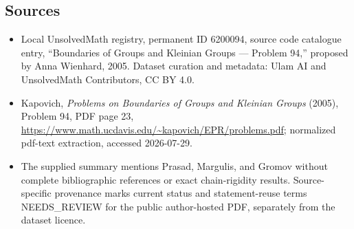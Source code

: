 \documentclass[11pt]{article}
\begin{document}
\subsection{Sources}
\begin{itemize}
\item Local UnsolvedMath registry, permanent ID 6200094, source code catalogue entry, ``Boundaries of Groups and Kleinian Groups --- Problem 94,'' proposed by Anna Wienhard, 2005. Dataset curation and metadata: Ulam AI and UnsolvedMath Contributors, CC BY 4.0.
\item Kapovich, \emph{Problems on Boundaries of Groups and Kleinian Groups} (2005), Problem 94, PDF page 23, \url{https://www.math.ucdavis.edu/~kapovich/EPR/problems.pdf}; normalized pdf-text extraction, accessed 2026-07-29.
\item The supplied summary mentions Prasad, Margulis, and Gromov without complete bibliographic references or exact chain-rigidity results. Source-specific provenance marks current status and statement-reuse terms NEEDS\_REVIEW for the public author-hosted PDF, separately from the dataset licence.
\end{itemize}
\end{document}
